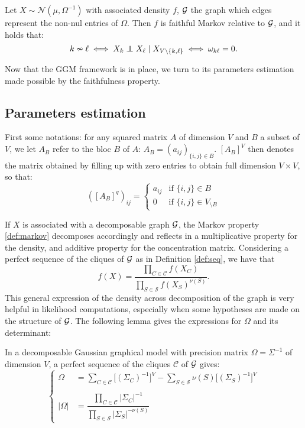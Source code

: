 \begin{prop}\label{ggm:faith}
 Let $X\sim \mathcal{N}(\mu, \Omega^{-1})$ with associated density $f$, $\mathcal{G}$ the graph which edges represent the non-nul entries of $\Omega$. Then $f$ is faithful Markov relative to $\mathcal{G}$,  and it holds that:
 $$k\nsim \ell \iff  X_k \independent X_\ell \mid X_{V\setminus\{k,\ell\}} \iff \omega_{k\ell}=0.$$
\end{prop} 


 Now that the GGM framework is in place, we turn to its parameters estimation made possible by the faithfulness property.

 \subsection{Parameters estimation}
First some notations: for any  squared  matrix $A$ of dimension $V$ and $B$ a subset of $V$, we let $A_B$ refer to the bloc $B$ of $A$: $A_{B}=(a_{ij})_{\{i,j\}\in B}$.   $[A_B]^V$ then denotes the matrix obtained by filling up with zero entries to obtain full dimension $V\times V$, so that:
$$([A_B]^q )_{ij}=\left\{ \begin{array}{rl}
a_{ij} & \text{if } \{i,j\}\in B\\
0 &  \text{if } \{i,j\}\in V_{\setminus B}
\end{array}\right.$$

  If $X$ is associated with a decomposable graph $\mathcal{G}$, the Markov property \ref{def:markov} decomposes accordingly and reflects in a multiplicative property for the density, and additive property for the concentration matrix. Considering a perfect sequence of the cliques of $\mathcal{G}$ as in Definition \ref{def:seq}, we have that
 $$f(X)=\dfrac{\prod_{C\in \mathcal{C}} f(X_C)}{\prod_{S\in \mathcal{S}} f(X_S)^{\nu(S)}}.$$
This general expression of the density across decomposition of the graph is very helpful in likelihood computations, especially when some hypotheses are made on the structure of $\mathcal{G}$. The following lemma gives the expressions for $\Omega$ and its determinant:
 \begin{lemma} In a decomposable Gaussian graphical model with precision matrix $\Omega = \Sigma^{-1}$ of dimension $V$, a perfect sequence of the cliques $\mathcal{C}$ of $\mathcal{G}$ gives:
 \begin{equation*}
 \left\{
 \begin{array}{rl}
 \Omega &= \sum_{C\in \mathcal{C}} \big[(\Sigma_C)^{-1}\big]^V - \sum_{S\in \mathcal{S}} \nu(S)  \big[(\Sigma_S)^{-1}\big]^V \\\\
 |\Omega| &=\dfrac{\prod_{C\in \mathcal{C}} |\Sigma_C|^{-1}}{\prod_{S\in \mathcal{S}} |\Sigma_S|^{-\nu(S)}}
 \end{array} \right.
\end{equation*}  
\end{lemma}

